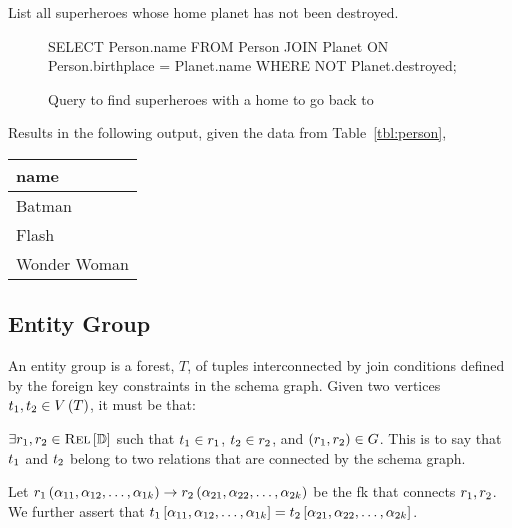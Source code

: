 		\begin{ex}
			List all superheroes whose home planet has not been destroyed.
			
			\begin{figure}[!ht]
				\begin{singlespaced}
					\begin{sqlcode}
SELECT Person.name
FROM   Person
       JOIN Planet
         ON Person.birthplace = Planet.name
WHERE  NOT Planet.destroyed;
					\end{sqlcode}
				\end{singlespaced}
				
				\caption{Query to find superheroes with a home to go back to}
			\end{figure}
			
			Results in the following output, given the data from Table~\ref{tbl:person},
			
			\begin{table}[!ht]
				\centering
				
				\begin{tabular}{l}
					\toprule
					name \\
					\midrule
					Batman \\
					Flash \\
					Wonder Woman \\
					\bottomrule
				\end{tabular}
			\end{table}
		\end{ex}
		
	\subsection{Entity Group}
		\begin{defn}
			An entity group is a forest, $T$,  of tuples interconnected by join conditions defined by the foreign key constraints in the schema graph.  Given two vertices $t_1, t_2 \in V\left(T\right)$, it must be that:

			$\exists r_1, r_2 \in \textsc{Rel}\left[\mathbb{D}\right]$ such that $t_1 \in r_1$, $t_2\in r_2$, and $\left(r_1, r_2\right)\in G$.  This is to say that $t_1$ and $t_2$ belong to two relations that are connected by the schema graph.

			Let $r_1\left(\alpha_{11}, \alpha_{12}, \dotsc, \alpha_{1k}\right) \to r_2\left(\alpha_{21}, \alpha_{22}, \dotsc, \alpha_{2k}\right)$ be the \gls{fk} that connects $r_1, r_2$.  We further assert that $t_1\left[\alpha_{11}, \alpha_{12}, \dotsc, \alpha_{1k}\right] = t_2\left[\alpha_{21}, \alpha_{22}, \dotsc, \alpha_{2k}\right]$.
		\end{defn}
		
